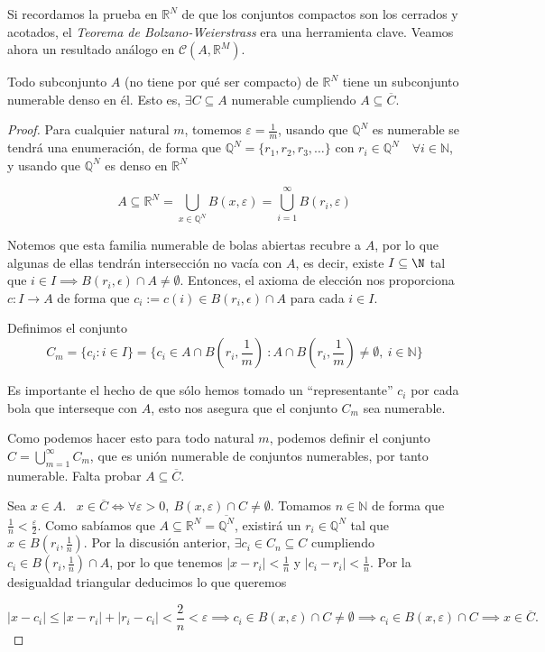 Si recordamos la prueba en $\mathbb{R}^N$ de que los conjuntos compactos son los cerrados y acotados, el \textit{Teorema de Bolzano-Weierstrass} era una herramienta clave. Veamos ahora un resultado análogo en $\mathcal{C}(A,\mathbb{R}^M)$.

\begin{lema} \label{conjunto_denso}
  Todo subconjunto $A$ (no tiene por qué ser compacto) de
  $\mathbb{R}^N$ tiene un subconjunto numerable denso en \'el. Esto
  es, $\exists C \subseteq A$ numerable cumpliendo
  $A \subseteq \overline{C}$.
\end{lema}

\begin{proof}
  Para cualquier natural $m$, tomemos $\varepsilon = \frac{1}{m}$,
  usando que $\mathbb{Q}^N$ es numerable se tendr\'a una enumeración, de forma que
  $\mathbb{Q}^N = \{r_1, r_2, r_3, \ldots\}$ con
  $r_i \in \mathbb{Q}^N \quad \forall i \in \mathbb{N}$, y usando
  que $\mathbb{Q}^N$ es denso en $\mathbb{R}^N$
 
  \[A \subseteq \mathbb{R}^N = \bigcup\limits_{x \in \mathbb{Q}^N}B(x,
    \varepsilon) = \bigcup\limits_{i=1}^\infty B(r_i, \varepsilon)\]

  Notemos que esta familia numerable de bolas abiertas recubre a $A$,
  por lo que algunas de ellas tendrán intersección no vacía con $A$, es decir, existe
  $I \subseteq \N$ tal que $i\in I \implies B(r_i,\epsilon) \cap A \neq \emptyset$.
  Entonces, el axioma de elección nos proporciona $c: I \to A$ de forma que $c_i := c(i) \in B\left( r_i, \epsilon \right) \cap A $ para cada $i\in I$.


  
  Definimos el conjunto
  \[C_m = \{c_i  :   i \in I\} = \{c_i
    \in A \cap B(r_i, {\scriptstyle\frac{1}{m}}) \ : A \cap
    B(r_i,{\scriptstyle\frac{1}{m}}) \neq \emptyset, \ i \in
    \mathbb{N}\}\]

  Es importante el hecho de que s\'olo hemos tomado un
  ``representante'' $c_i$ por cada bola que interseque con $A$, esto
  nos asegura que el conjunto $C_m$ sea numerable.

  Como podemos hacer esto para todo natural $m$, podemos definir el
conjunto \(C = \bigcup_{m=1}^\infty C_m\), que es unión
numerable de conjuntos numerables, por tanto numerable. Falta
probar $A \subseteq \overline{C}$.

Sea $x \in A$.~
$x \in \overline{C} \iff \forall \varepsilon > 0, \ B(x, \varepsilon)
\cap C \neq \emptyset$. Tomamos $n \in \mathbb{N}$ de forma que
$\frac{1}{n} < \frac{\varepsilon}{2}$. Como sabíamos que
$A \subseteq \mathbb{R}^N = \overline{\mathbb{Q}^N}$, existir\'a un
$r_i \in \mathbb{Q}^N$ tal que $x \in B(r_i, \frac{1}{n})$. Por la discusión anterior, $\exists c_i \in C_n \subseteq C$ cumpliendo
$c_i \in B(r_i, \frac{1}{n}) \cap A$, por lo que tenemos
$|x-r_i| < \frac{1}{n}$ y $|c_i-r_i| < \frac{1}{n}$. Por la
desigualdad triangular deducimos lo que queremos

\[
	|x - c_i| \leq |x-r_i| + |r_i-c_i| < \frac{2}{n} < \varepsilon
  \implies c_i \in B(x, \varepsilon) \cap C \neq \emptyset \implies
  c_i \in B(x, \varepsilon) \cap C \implies x \in \overline{C}
.\]

\end{proof}

